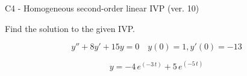 \begin{exercise}
  \begin{exerciseTitle}C4 - Homogeneous second-order linear IVP (ver. 10)\end{exerciseTitle}
  \begin{exerciseStatement}
    
Find the solution to the given IVP.

    
\[y''+8y'+15y = 0 \hspace{1em} y(0) = 1 , y'(0) = -13\]

  \end{exerciseStatement}
  \begin{exerciseAnswer}
    
\[y= -4 \, e^{\left(-3 \, t\right)} + 5 \, e^{\left(-5 \, t\right)}\]

  \end{exerciseAnswer}
\end{exercise}